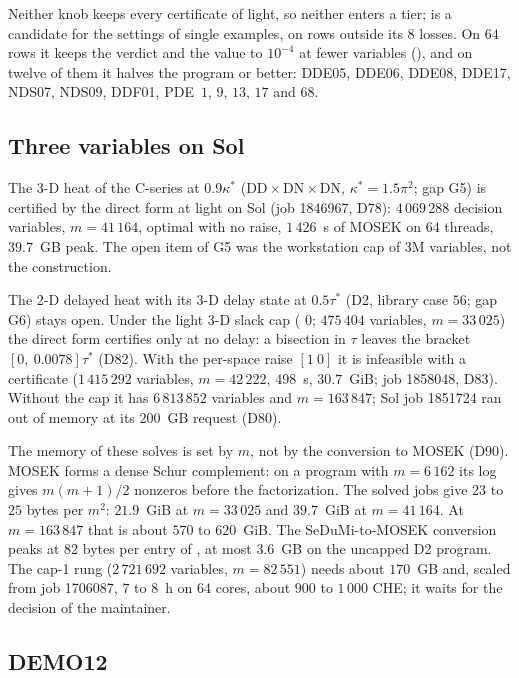 Neither knob keeps every certificate of light, so neither enters a tier;  is a candidate for the settings of single examples, on rows outside its $8$ losses. On $64$ rows it keeps the verdict and the value to $10^{-4}$ at fewer variables (), and on twelve of them it halves the program or better: DDE05, DDE06, DDE08, DDE17, NDS07, NDS09, DDF01, PDE~$1$, $9$, $13$, $17$ and $68$.

\subsection{Three variables on Sol}\label{sec:libpass-sol}

The 3-D heat of the C-series at $0.9\kappa^*$ ($\mathrm{DD}\times\mathrm{DN}\times\mathrm{DN}$, $\kappa^*=1.5\pi^2$; gap G5) is certified by the direct form at light on Sol (job 1846967, D78): $4\,069\,288$ decision variables, $m=41\,164$, optimal with no raise, $1\,426$~s of MOSEK on $64$ threads, $39.7$~GB peak. The open item of G5 was the workstation cap of $3$M variables, not the construction.

The 2-D delayed heat with its 3-D delay state at $0.5\tau^*$ (D2, library case $56$; gap G6) stays open. Under the light 3-D slack cap ( $0$; $475\,404$ variables, $m=33\,025$) the direct form certifies only at no delay: a bisection in $\tau$ leaves the bracket $[0,\ 0.0078]\tau^*$ (D82). With the per-space raise  $[1\ 0]$ it is infeasible with a certificate ($1\,415\,292$ variables, $m=42\,222$, $498$~s, $30.7$~GiB; job 1858048, D83). Without the cap it has $6\,813\,852$ variables and $m=163\,847$; Sol job 1851724 ran out of memory at its $200$~GB request (D80).

The memory of these solves is set by $m$, not by the conversion to MOSEK (D90). MOSEK forms a dense Schur complement: on a program with $m=6\,162$ its log gives $m(m+1)/2$ nonzeros before the factorization. The solved jobs give $23$ to $25$ bytes per $m^2$: $21.9$~GiB at $m=33\,025$ and $39.7$~GiB at $m=41\,164$. At $m=163\,847$ that is about $570$ to $620$~GiB. The SeDuMi-to-MOSEK conversion peaks at $82$ bytes per entry of , at most $3.6$~GB on the uncapped D2 program. The cap-1 rung ($2\,721\,692$ variables, $m=82\,551$) needs about $170$~GB and, scaled from job 1706087, $7$ to $8$~h on $64$ cores, about $900$ to $1\,000$ CHE; it waits for the decision of the maintainer.

\subsection{DEMO12}\label{sec:libpass-demo12}

